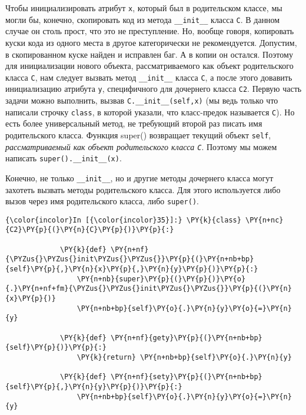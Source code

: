 Чтобы инициализировать атрибут \texttt{x}, который был в родительском
классе, мы могли бы, конечно, скопировать код из метода
\texttt{\_\_init\_\_} класса \texttt{C}. В данном случае он столь прост,
что это не преступление. Но, вообще говоря, копировать куски кода из
одного места в другое категорически не рекомендуется. Допустим, в
скопированном куске найден и исправлен баг. А в копии он остался.
Поэтому для инициализации нового объекта, рассматриваемого как объект
родительского класса \texttt{C}, нам следует вызвать метод
\texttt{\_\_init\_\_} класса \texttt{C}, а после этого довавить
инициализацию атрибута \texttt{y}, специфичного для дочернего класса
\texttt{C2}. Первую часть задачи можно выполнить, вызвав
\texttt{C.\_\_init\_\_(self,x)} (мы ведь только что написали строчку
\texttt{class}, в которой указали, что класс-предок называется
\texttt{C}). Но есть более универсальный метод, не требующий второй раз
писать имя родительского класса. Функция super() возвращает текущий
объект \texttt{self}, \emph{рассматриваемый как объект родительского
класса \texttt{C}}. Поэтому мы можем написать
\texttt{super().\_\_init\_\_(x)}.

Конечно, не только \texttt{\_\_init\_\_}, но и другие методы дочернего
класса могут захотеть вызвать методы родительского класса. Для этого
используется либо вызов через имя родительского класса, либо
\texttt{super()}.

    \begin{Verbatim}[commandchars=\\\{\}]
{\color{incolor}In [{\color{incolor}35}]:} \PY{k}{class} \PY{n+nc}{C2}\PY{p}{(}\PY{n}{C}\PY{p}{)}\PY{p}{:}
             
             \PY{k}{def} \PY{n+nf}{\PYZus{}\PYZus{}init\PYZus{}\PYZus{}}\PY{p}{(}\PY{n+nb+bp}{self}\PY{p}{,}\PY{n}{x}\PY{p}{,}\PY{n}{y}\PY{p}{)}\PY{p}{:}
                 \PY{n+nb}{super}\PY{p}{(}\PY{p}{)}\PY{o}{.}\PY{n+nf+fm}{\PYZus{}\PYZus{}init\PYZus{}\PYZus{}}\PY{p}{(}\PY{n}{x}\PY{p}{)}
                 \PY{n+nb+bp}{self}\PY{o}{.}\PY{n}{y}\PY{o}{=}\PY{n}{y}
                 
             \PY{k}{def} \PY{n+nf}{gety}\PY{p}{(}\PY{n+nb+bp}{self}\PY{p}{)}\PY{p}{:}
                 \PY{k}{return} \PY{n+nb+bp}{self}\PY{o}{.}\PY{n}{y}
             
             \PY{k}{def} \PY{n+nf}{sety}\PY{p}{(}\PY{n+nb+bp}{self}\PY{p}{,}\PY{n}{y}\PY{p}{)}\PY{p}{:}
                 \PY{n+nb+bp}{self}\PY{o}{.}\PY{n}{y}\PY{o}{=}\PY{n}{y}
\end{Verbatim}

